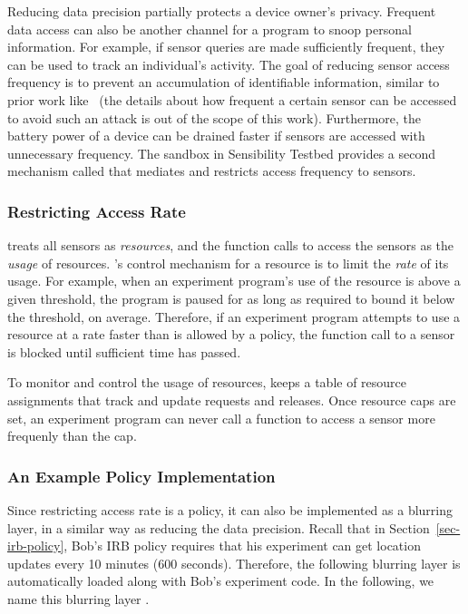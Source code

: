 Reducing data precision partially protects a device owner's privacy. Frequent data 
access can also be another channel for a program to snoop personal information.
For example, if sensor queries are made sufficiently frequent, they can be used
to track an individual's activity. The goal of reducing sensor access frequency 
is to prevent an accumulation of identifiable 
information, similar to prior work like~\cite{gruteser2003anonymous} (the 
details about how frequent a certain sensor can be accessed to avoid such an 
attack is out of the scope of this work). 
Furthermore, the battery power of a device can 
be drained faster if sensors are accessed
with unnecessary frequency. The sandbox in Sensibility Testbed provides a second mechanism
called  that mediates and restricts access frequency to sensors. 

\subsubsection{Restricting Access Rate}

 treats all sensors as \textit{resources}, and the function calls to 
access the sensors as the \textit{usage} of resources. 's control 
mechanism for a resource is to limit the \textit{rate} of its usage. For example, 
when an 
experiment program's use of the resource is above a given threshold, the 
program is paused for as long as required to bound it below the
threshold, on average. Therefore, if an experiment program attempts to 
use a resource at a rate faster than is allowed by a policy, the function 
call to a sensor is blocked until sufficient time has passed. 

To monitor and control the usage of resources,  keeps a 
table of resource assignments that track and update requests and releases. 
Once resource caps are set, an experiment program can never call a 
function to access a sensor more frequenly than the cap. 

\subsubsection{An Example Policy Implementation}\label{sec-rate-example}

Since restricting access rate is a policy, it can also be implemented as a 
blurring layer, in a similar way as reducing the data precision.
Recall that in Section~\ref{sec-irb-policy}, Bob's IRB policy requires that
his experiment can get location updates every 10 minutes (600 seconds). 
Therefore, the following blurring layer is automatically loaded along with 
Bob's experiment code. In the following, we name this blurring layer 
.

